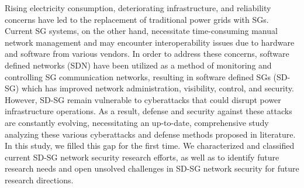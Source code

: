 \documentclass[conference]{IEEEtran}
\begin{document}
Rising electricity consumption, deteriorating infrastructure, and reliability concerns have led to the replacement of traditional power grids with SGs. Current SG systems, on the other hand, necessitate time-consuming manual network management and may encounter interoperability issues due to hardware and software from various vendors. In order to address these concerns, software defined networks (SDN) have been utilized as a method of monitoring and controlling SG communication networks, resulting in software defined SGs (SD-SG) which has improved network administration, visibility, control, and security. However, SD-SG remain vulnerable to cyberattacks that could disrupt power infrastructure operations. As a result, defense and security against these attacks are constantly evolving, necessitating an up-to-date, comprehensive study analyzing these various cyberattacks and defense methods proposed in literature. In this study, we filled this gap for the first time. We characterized and classified current SD-SG network security research efforts, as well as to identify future research needs and open unsolved challenges in SD-SG network security for future research directions.





\end{document}
